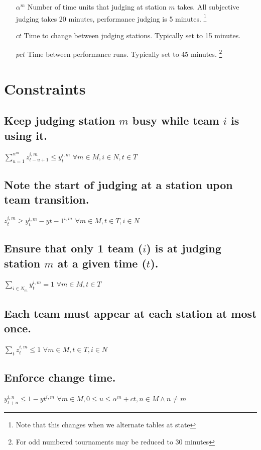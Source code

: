 \documentclass[letterpaper,11pt]{report}
\newcommand{\doccomment}[3]%
{\marginpar{\textcolor{#2}{\bf #1}}%
\footnote{{\color{#2}#3}}%
}
\newcommand{\doccomment}[3]{}
\newcommand{\jpscomment}[1]%
{\doccomment{SCHEWE}{Bittersweet}{#1}}
\begin{document}
\begin{itemize}
\item[$\alpha^{m}$] Number of time units that judging at station $m$
  takes. All subjective judging takes 20 minutes, performance judging is 5
  minutes. \jpscomment{Note that this changes when we alternate tables at state}

\item[$ct$] Time to change between judging stations. Typically set to 15
  minutes.
\item[$pct$] Time between performance runs. Typically set to 45
  minutes. \jpscomment{For odd numbered tournaments may be reduced to 30
    minutes}


\end{itemize}

\section{Constraints}

\subsection{Keep judging station $m$ busy while team $i$ is using it.}
$\sum\limits_{u=1}^{\alpha^{m}} z_{t-u+1}^{i,m} \le y_{t}^{i,m}$
\hfill $\forall m \in M, i \in N, t \in T$

\subsection{Note the start of judging at a station upon team transition.}
$z_{t}^{i,m} \ge y_{t}^{i,m} - y{t-1}^{i,m}$
\hfill $\forall m \in M, t \in T, i \in N$

\subsection{Ensure that only 1 team ($i$) is at judging station $m$ at a given time
($t$).}
$\sum\limits_{i \in N_{m}} y_{t}^{i,m} = 1$          
\hfill $\forall m \in M, t \in T$

\subsection{Each team must appear at each station at most once.}
$\sum\limits_{t} z_{t}^{i,m} \le 1$
\hfill $\forall m \in M, t \in T, i \in N$

\subsection{Enforce change time.}
$y_{t+u}^{i,n} \le 1 - y{t}^{i,m}$
\hfill $\forall m \in M, 0 \le u \le \alpha^{m} + ct, n \in M \wedge n \neq m$
\end{document}
